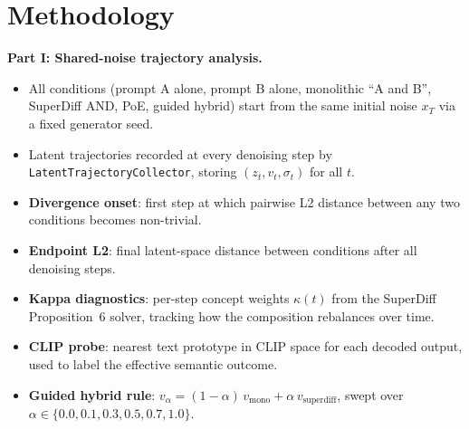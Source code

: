 \documentclass[runningheads]{llncs}
\begin{document}
\section{Methodology}

\textbf{Part I\@: Shared-noise trajectory analysis.}
\begin{itemize}
  \item All conditions (prompt A alone, prompt B alone, monolithic ``A and B'',
    SuperDiff AND, PoE, guided hybrid) start from the same initial noise
    $x_T$ via a fixed generator seed.
  \item Latent trajectories recorded at every denoising step by
    \texttt{LatentTrajectoryCollector}, storing $(z_t, v_t, \sigma_t)$
    for all $t$.
  \item \textbf{Divergence onset}: first step at which pairwise L2 distance
    between any two conditions becomes non-trivial.
  \item \textbf{Endpoint L2}: final latent-space distance between conditions
    after all denoising steps.
  \item \textbf{Kappa diagnostics}: per-step concept weights $\kappa(t)$
    from the SuperDiff Proposition~6 solver, tracking how the composition
    rebalances over time.
  \item \textbf{CLIP probe}: nearest text prototype in CLIP space for each
    decoded output, used to label the effective semantic outcome.
  \item \textbf{Guided hybrid rule}: $v_\alpha = (1-\alpha)\,v_{\text{mono}}
    + \alpha\,v_{\text{superdiff}}$, swept over
    $\alpha \in \{0.0, 0.1, 0.3, 0.5, 0.7, 1.0\}$.
\end{itemize}
\end{document}
